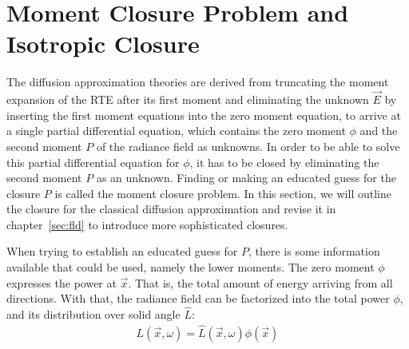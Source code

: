 \section{Moment Closure Problem and Isotropic Closure}
\label{sec:moment_closure}

The diffusion approximation theories are derived from truncating the moment expansion of the RTE after its first moment and eliminating the unknown $\vec{E}$ by inserting the first moment equations into the zero moment equation, to arrive at a single partial differential equation, which contains the zero moment $\phi$ and the second moment $P$ of the radiance field as unknowns. In order to be able to solve this partial differential equation for $\phi$, it has to be closed by eliminating the second moment $P$ as an unknown. Finding or making an educated guess for the closure $P$ is called the moment closure problem. In this section, we will outline the closure for the classical diffusion approximation and revise it in chapter~\ref{sec:fld} to introduce more sophisticated closures.

When trying to establish an educated guess for $P$, there is some information available that could be used, namely the lower moments. The zero moment $\phi$ expresses the power at $\vec{x}$. That is, the total amount of energy arriving from all directions. With that, the radiance field can be factorized into the total power $\phi$, and its distribution over solid angle $\hat{L}$:
\begin{align*}
L(\vec{x}, \omega) = \hat{L}(\vec{x}, \omega)\phi(\vec{x})
\end{align*}

